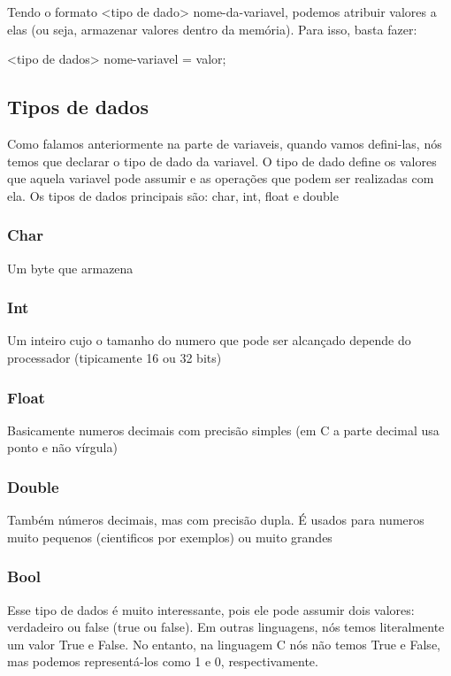 \documentclass{report}
\begin{document}
    Tendo o formato <tipo de dado> nome-da-variavel, podemos atribuir valores a elas (ou seja, armazenar valores dentro da memória). Para isso, basta fazer:
    
    \begin{LARGE}
    	\begin{center}
    		<tipo de dados> nome-variavel = valor;
    	\end{center}
    \end{LARGE}
    
	\subsection{Tipos de dados}
	Como falamos anteriormente na parte de variaveis, quando vamos defini-las, nós temos que declarar o tipo de dado da variavel. O tipo de dado define os valores que aquela variavel pode assumir e as operações que podem ser realizadas com ela.
	Os tipos de dados principais são: char, int, float e double
	\subsubsection{Char}
	Um byte que armazena
	\subsubsection{Int}
	Um inteiro cujo o tamanho do numero que pode ser alcançado depende do processador (tipicamente 16 ou 32 bits)
	\subsubsection{Float}
	Basicamente numeros decimais com precisão simples (em C a parte decimal usa ponto e não vírgula)
	\subsubsection{Double}
	Também números decimais, mas com precisão dupla. É usados para numeros muito pequenos (cientificos por exemplos) ou muito grandes
	
	\subsubsection{Bool}
	Esse tipo de dados é muito interessante, pois ele pode assumir dois valores: verdadeiro ou false (true ou false). Em outras linguagens, nós temos literalmente um valor True e False. No entanto, na linguagem C nós não temos True e False, mas podemos representá-los como 1 e 0, respectivamente.
\end{document}
